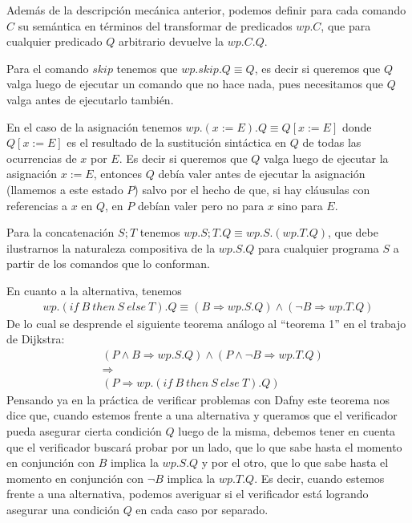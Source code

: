 \documentclass[12pt, a4paper, openany, fleqn]{book}
\begin{document}
    Además de la descripción mecánica anterior, podemos definir para cada comando $C$ su semántica en términos del transformar de predicados $wp.C$, que para cualquier predicado $Q$ arbitrario devuelve la $wp.C.Q$.

    Para el comando $skip$ tenemos que $wp.skip.Q \equiv Q$, es decir si queremos que $Q$ valga luego de ejecutar un comando que no hace nada, pues necesitamos que $Q$ valga antes de ejecutarlo también.

    En el caso de la asignación tenemos $wp.(x:=E).Q \equiv Q[x:=E]$ donde $Q[x:=E]$ es el resultado de la sustitución sintáctica en $Q$ de todas las ocurrencias de $x$ por $E$. Es decir si queremos que $Q$ valga luego de ejecutar la asignación $x:=E$, entonces $Q$ debía valer antes de ejecutar la asignación (llamemos a este estado $P$) salvo por el hecho de que, si hay cláusulas con referencias a $x$ en $Q$, en $P$ debían valer pero no para $x$ sino para $E$.

    Para la concatenación $S;T$ tenemos $wp.S;T.Q \equiv wp.S.(wp.T.Q)$, que debe ilustrarnos la naturaleza compositiva de la $wp.S.Q$ para cualquier programa $S$ a partir de los comandos que lo conforman.

    En cuanto a la alternativa, tenemos
    \begin{align*}
        wp.(if\ B\ then\ S\ else\ T).Q \equiv (B \Rightarrow wp.S.Q) \land (\lnot B \Rightarrow wp.T.Q)
    \end{align*}
    De lo cual se desprende el siguiente teorema análogo al ``teorema 1'' en el trabajo de Dijkstra:
    \begin{align*}
        &(P \land B \Rightarrow wp.S.Q) \land (P \land \lnot B \Rightarrow wp.T.Q) \\
        &\Rightarrow \\
        &(P \Rightarrow wp.(if\ B\ then\ S\ else\ T).Q)
    \end{align*}
    Pensando ya en la práctica de verificar problemas con Dafny este teorema nos dice que, cuando estemos frente a una alternativa y queramos que el verificador pueda asegurar cierta condición $Q$ luego de la misma, debemos tener en cuenta que el verificador buscará probar por un lado, que lo que sabe hasta el momento en conjunción con $B$ implica la $wp.S.Q$ y por el otro, que lo que sabe hasta el momento en conjunción con $\lnot B$ implica la $wp.T.Q$. Es decir, cuando estemos frente a una alternativa, podemos averiguar si el verificador está logrando asegurar una condición $Q$ en cada caso por separado.
\end{document}
